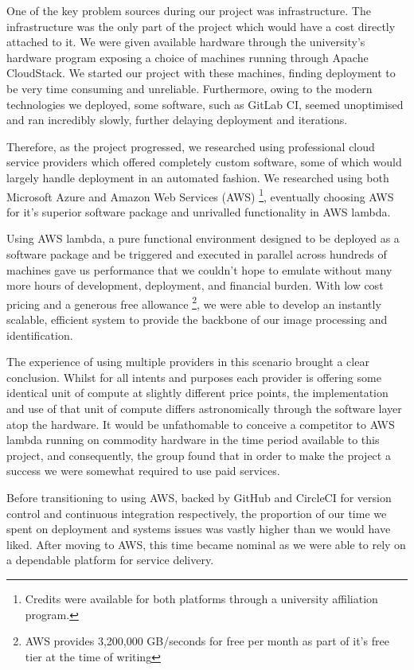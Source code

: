 One of the key problem sources during our project was infrastructure. The infrastructure was the only part of the project which would have a cost directly attached to it. We were given available hardware through the university's hardware program exposing a choice of machines running through Apache CloudStack. We started our project with these machines, finding deployment to be very time consuming and unreliable. Furthermore, owing to the modern technologies we deployed, some software, such as GitLab CI, seemed unoptimised and ran incredibly slowly, further delaying deployment and iterations.

Therefore, as the project progressed, we researched using professional cloud service providers which offered completely custom software, some of which would largely handle deployment in an automated fashion. We researched using both Microsoft Azure and Amazon Web Services (AWS) \footnote{Credits were available for both platforms through a university affiliation program.}, eventually choosing AWS for it's superior software package and unrivalled functionality in AWS lambda.

Using AWS lambda, a pure functional environment designed to be deployed as a software package and be triggered and executed in parallel across hundreds of machines gave us performance that we couldn't hope to emulate without many more hours of development, deployment, and financial burden. With low cost pricing and a generous free allowance \footnote{AWS provides 3,200,000 GB/seconds for free per month as part of it's free tier at the time of writing}, we were able to develop an instantly scalable, efficient system to provide the backbone of our image processing and identification.

The experience of using multiple providers in this scenario brought a clear conclusion. Whilst for all intents and purposes each provider is offering some identical unit of compute at slightly different price points, the implementation and use of that unit of compute differs astronomically through the software layer atop the hardware. It would be unfathomable to conceive a competitor to AWS lambda running on commodity hardware in the time period available to this project, and consequently, the group found that in order to make the project a success we were somewhat required to use paid services.

Before transitioning to using AWS, backed by GitHub and CircleCI for version control and continuous integration respectively, the proportion of our time we spent on deployment and systems issues was vastly higher than we would have liked. After moving to AWS, this time became nominal as we were able to rely on a dependable platform for service delivery.

